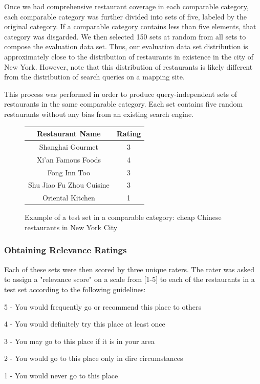 Once we had comprehensive restaurant coverage in each comparable category,
each comparable category was further divided into sets of five, labeled by the original category.
If a comparable category contains less than five elements, that category was disgarded.
We then selected 150 sets at random from all sets to compose the evaluation data set.
Thus, our evaluation data set distribution is approximately close to the distribution of restaurants
in existence in the city of New York.
However, note that this distribution of restaurants is likely different 
from the distribution of search queries on a mapping site.

This process was performed in order to produce query-independent sets of 
restaurants in the same comparable category.
Each set contains five random restaurants without any bias from an existing search engine.

\begin{figure}
  \begin{center}
    \begin{tabular}{|c|c|}
      \hline
      Restaurant Name           & Rating \\
      \hline
      \hline
      Shanghai Gourmet          & 3 \\
      \hline
      Xi'an Famous Foods        & 4 \\
      \hline
      Fong Inn Too              & 3 \\
      \hline
      Shu Jiao Fu Zhou Cuisine  & 3 \\
      \hline
      Oriental Kitchen          & 1 \\
      \hline
    \end{tabular}
  \end{center}
  \caption{Example of a test set in a comparable category: 
  cheap Chinese restaurants in New York City}
  \label{fig:testset}
\end{figure}

\subsubsection{Obtaining Relevance Ratings}
Each of these sets were then scored by three unique raters.
The rater was asked to assign a "relevance score" on a scale from [1-5] 
to each of the restaurants in a test set according to the following guidelines:
\squishlist
	\item 5 - You would frequently go or recommend this place to others
	\item 4 - You would definitely try this place at least once
	\item 3 - You may go to this place if it is in your area
	\item 2 - You would go to this place only in dire circumstances
	\item 1 - You would never go to this place
  
